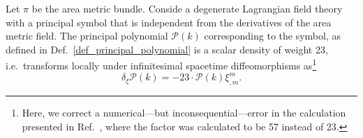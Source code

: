 \begin{theorem}\label{thm_poly_trafo}
  Let $\pi$ be the area metric bundle. Conside a degenerate Lagrangian field theory with a principal symbol that is independent from the derivatives of the area metric field. The principal polynomial $\mathcal P(k)$ corresponding to the symbol, as defined in Def.~\ref{def_principal_polynomial} is a scalar density of weight 23, i.e.~transforms locally under infinitesimal spacetime diffeomorphisms as\footnote{Here, we correct a numerical---but inconsequential---error in the calculation presented in Ref.~\cite{Alex_2020_2}, where the factor was calculated to be 57 instead of 23.}
  \begin{equation}
    \delta_\xi \mathcal P(k) = -23 \cdot \mathcal P(k) \xi^m_{,m}.
  \end{equation}
\end{theorem}
